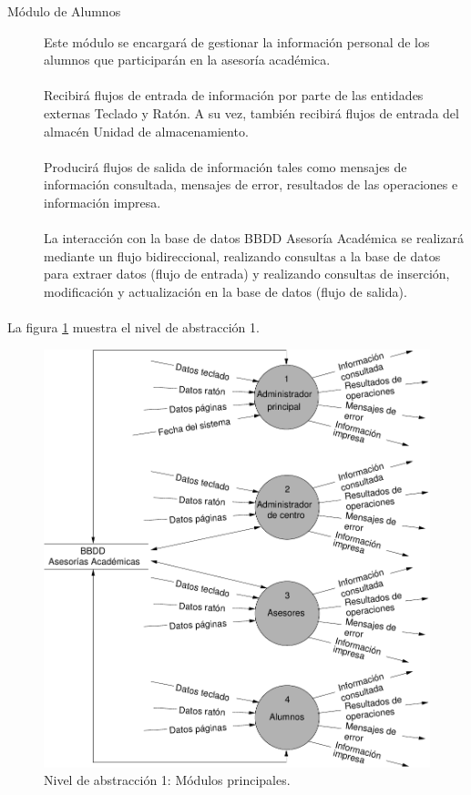 \begin{description}
   \item[Módulo de Alumnos] Este módulo se encargará de gestionar la información
   personal de los alumnos que participarán en la asesoría académica.

   \paragraph{}Recibirá flujos de entrada de información por parte de las
   entidades externas Teclado y Ratón. A su vez, también recibirá flujos de
   entrada del almacén Unidad de almacenamiento.

   \paragraph{}Producirá flujos de salida de información tales como mensajes de
   información consultada, mensajes de error, resultados de las operaciones e
   información impresa.

   \paragraph{}La interacción con la base de datos BBDD Asesoría Académica se
   realizará mediante un flujo bidireccional, realizando consultas a la base de
   datos para extraer datos (flujo de entrada) y realizando consultas de
   inserción, modificación y actualización en la base de datos (flujo de
   salida).
  \end{description}

  \paragraph{}La figura \ref{diagramaNivel1} muestra el nivel de abstracción 1.

        \begin{figure}[!ht]
            \begin{center}
            \includegraphics[]{08.Analisis_Funcional/8.2.DFDs/Niveles/Diagramas/nivel1.pdf}
            \caption{Nivel de abstracción 1: Módulos principales.}
            \label{diagramaNivel1}
            \end{center}
         \end{figure}